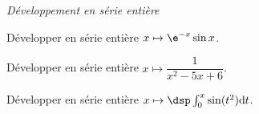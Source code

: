 \documentclass[a4paper,10pt]{report}
\begin{document}
\medskip

\begin{center}
\textit{{ {\large Développement en série entière}}}
\end{center}

\medskip

\begin{Exa} Développer en série entière $x \mapsto \e^{-x}\sin x$.
\end{Exa}


\begin{Exa} Développer en série entière $x \mapsto \dfrac{1}{x^2-5x+6}$.
\end{Exa}


\begin{Exa} Développer en série entière $x \mapsto \dsp\int_0^x\sin(t^2)\mathrm{d}t$.
\end{Exa}
\end{document}
